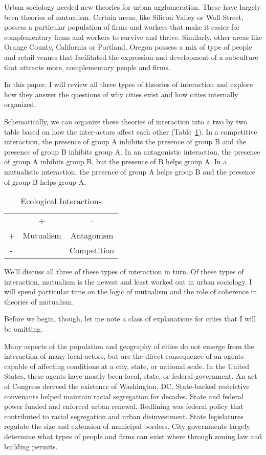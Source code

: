 Urban sociology needed new theories for urban agglomeration. These
have largely been theories of mutualism. Certain areas, like Silicon
Valley or Wall Street, possess a particular population of firms and
workers that make it easier for complementary firms and workers to
survive and thrive. Similarly, other areas like Orange County,
California or Portland, Oregon possess a mix of type of people and
retail venues that facilitated the expression and development of a
subculture that attracts more, complementary people and firms.

In this paper, I will review all three types of theories of
interaction and explore how they answer the questions of why cities
exist and how cities internally organized. 

Schematically, we can organize these theories of interaction into a
two by two table based on how the inter-actors affect each other
(Table~\ref{tab:ecological}). In a competitive interaction, the
presence of group A inhibits the presence of group B and the presence
of group B inhibits group A. In an antagonistic interaction, the
presence of group A inhibits group B, but the presence of B helps
group A. In a mutualistic interaction, the presence of
group A helps group B and the presence of group B helps group A.

\begin{table}[h]
\centering
\begin{tabular}{ccc}
  & +          & -           \\
+ & Mutualism  & Antagonism  \\
- &            & Competition  
\end{tabular}
\caption{Ecological Interactions}
\label{tab:ecological}
\end{table}

We'll discuss all three of these types of interaction in turn. Of
these types of interaction, mutualism is the newest and least worked
out in urban sociology. I will spend particular time on the logic of
mutualism and the role of coherence in theories of mutualism.

Before we begin, though, let me note a class of explanations for
cities that I will be omitting.

Many aspects of the population and geography of cities do not emerge
from the interaction of many local actors, but are the direct
consequence of an agents capable of affecting conditions at a city,
state, or national scale. In the United States, these agents have
mostly been local, state, or federal government. An act of Congress
decreed the existence of Washington, DC. State-backed restrictive
convenants helped maintain racial segregation for decades. State and
federal power funded and enforced urban renewal. Redlining was federal
policy that contributed to racial segregation and urban
disinvestment. State legislatures regulate the size and extension of
municipal borders. City governments largely determine what types of
people and firms can exist where through zoning law and building
permits.

